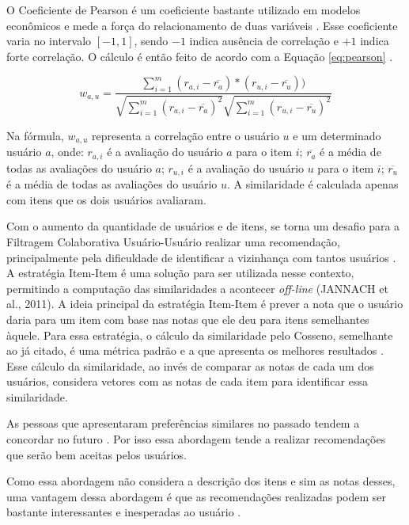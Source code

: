 O Coeficiente de Pearson é um coeficiente bastante utilizado em modelos econômicos e mede a força do relacionamento
de duas variáveis \cite{torres2004personalizaccao}. Esse coeficiente varia no intervalo $[-1, 1]$, sendo $-1$ indica
ausência de correlação e $+1$ indica forte correlação. O cálculo é então feito de acordo com a Equação \ref{eq:pearson}
\cite{torres2004personalizaccao}.

\begin{equation}
  w_{a,u} = \frac{\sum_{i=1}^{m}(r_{a,i} - \overline{r_a})*(r_{u,i} - \overline{r_u}))}{\sqrt{\sum_{i=1}^{m}(r_{a,i} - \overline{r_a})^2} \sqrt{\sum_{i=1}^{m}(r_{u,i} - \overline{r_u})^2}}
  \label{eq:pearson}
\end{equation}

Na fórmula, $w_{a,u}$ representa a correlação entre o usuário $u$ e um determinado usuário $a$, onde: $r_{a,i}$ é a avaliação
do usuário $a$ para o item $i$; $\overline{r_a}$ é a média de todas as avaliações do usuário $a$; $r_{u,i}$ é a avaliação do usuário
$u$ para o item $i$; $\overline{r_u}$ é a média de todas as avaliações do usuário $u$. A similaridade é calculada apenas com
itens que os dois usuários avaliaram.

Com o aumento da quantidade de usuários e de itens, se torna um desafio para a Filtragem Colaborativa Usuário-Usuário
realizar uma recomendação, principalmente pela dificuldade de identificar a vizinhança com tantos usuários
\cite{jannach2010recommender}. A estratégia Item-Item é uma solução para ser utilizada nesse contexto, permitindo a
computação das similaridades a acontecer \textit{off-line} (JANNACH et al., 2011). A ideia principal da estratégia Item-Item
é prever a nota que o usuário daria para um item com base nas notas que ele deu para itens semelhantes àquele. Para
essa estratégia, o cálculo da similaridade pelo Cosseno, semelhante ao já citado, é uma métrica padrão e a que
apresenta os melhores resultados \cite{jannach2010recommender}. Esse cálculo da similaridade, ao invés de comparar
as notas de cada um dos usuários, considera vetores com as notas de cada item para identificar essa similaridade.

As pessoas que apresentaram preferências similares no passado tendem a concordar no futuro \cite{ricci2011introduction}.
Por isso essa abordagem tende a realizar recomendações que serão bem aceitas pelos usuários.

Como essa abordagem não considera a descrição dos itens e sim as notas desses, uma vantagem dessa abordagem é que as
recomendações realizadas podem ser bastante interessantes e inesperadas ao usuário \cite{ricci2011introduction}.

